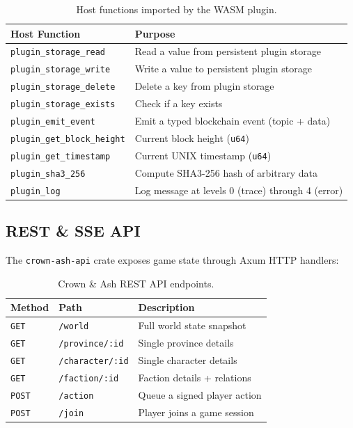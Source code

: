 \documentclass[a4paper, 11pt]{article}
\newcommand{\crateref}[1]{\texttt{crown-ash-#1}}
\begin{document}
\begin{table}[htbp]
\centering
\caption{Host functions imported by the WASM plugin.}
\label{tab:host-fns}
\begin{tabular}{@{}lp{8cm}@{}}
\toprule
\textbf{Host Function} & \textbf{Purpose} \\
\midrule
\texttt{plugin\_storage\_read}   & Read a value from persistent plugin storage \\
\texttt{plugin\_storage\_write}  & Write a value to persistent plugin storage \\
\texttt{plugin\_storage\_delete} & Delete a key from plugin storage \\
\texttt{plugin\_storage\_exists} & Check if a key exists \\
\texttt{plugin\_emit\_event}     & Emit a typed blockchain event (topic + data) \\
\texttt{plugin\_get\_block\_height} & Current block height (\texttt{u64}) \\
\texttt{plugin\_get\_timestamp}  & Current UNIX timestamp (\texttt{u64}) \\
\texttt{plugin\_sha3\_256}       & Compute SHA3-256 hash of arbitrary data \\
\texttt{plugin\_log}             & Log message at levels 0 (trace) through 4 (error) \\
\bottomrule
\end{tabular}
\end{table}

\subsection{REST \& SSE API}

The \crateref{api} crate exposes game state through Axum HTTP handlers:

\begin{table}[htbp]
\centering
\caption{Crown \& Ash REST API endpoints.}
\label{tab:api}
\begin{tabular}{@{}llp{6cm}@{}}
\toprule
\textbf{Method} & \textbf{Path} & \textbf{Description} \\
\midrule
\texttt{GET}  & \texttt{/world}           & Full world state snapshot \\
\texttt{GET}  & \texttt{/province/:id}    & Single province details \\
\texttt{GET}  & \texttt{/character/:id}   & Single character details \\
\texttt{GET}  & \texttt{/faction/:id}     & Faction details + relations \\
\texttt{POST} & \texttt{/action}          & Queue a signed player action \\
\texttt{POST} & \texttt{/join}            & Player joins a game session \\
\bottomrule
\end{tabular}
\end{table}
\end{document}
